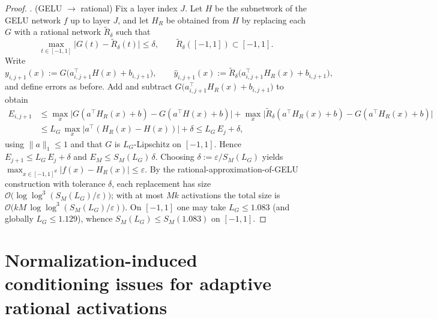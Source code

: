 \documentclass{article}
\theoremstyle{plain}
\theoremstyle{definition}
\theoremstyle{remark}
\begin{document}
\begin{proof}
. (GELU $\to$ rational) Fix a layer index $J$. Let $H$ be the subnetwork of the GELU network $f$ up to layer $J$, and let $H_R$ be obtained from $H$ by replacing each $G$ with a rational network $\widetilde R_\delta$ such that
\[
\max_{t\in[-1,1]}\bigl|G(t)-\widetilde R_\delta(t)\bigr|\le \delta,
\qquad
\widetilde R_\delta([-1,1])\subset[-1,1].
\]
Write
\[
y_{i,j+1}(x):=G\bigl(a_{i,j+1}^\top H(x)+b_{i,j+1}\bigr),\qquad
\widehat y_{i,j+1}(x):=\widetilde R_\delta\bigl(a_{i,j+1}^\top H_R(x)+b_{i,j+1}\bigr),
\]
and define errors as before. Add and subtract $G\bigl(a_{i,j+1}^\top H_R(x)+b_{i,j+1}\bigr)$ to obtain
\begin{align*}
E_{i,j+1}
&\le \max_{x}\bigl|G(a^\top H_R(x)+b)-G(a^\top H(x)+b)\bigr|
 + \max_{x}\bigl|\widetilde R_\delta(a^\top H_R(x)+b)-G(a^\top H_R(x)+b)\bigr| \\
&\le L_G\,\max_{x}\bigl|a^\top(H_R(x)-H(x))\bigr| + \delta
\le L_G\,E_j+\delta,
\end{align*}
using $\|a\|_1\le 1$ and that $G$ is $L_G$-Lipschitz on $[-1,1]$. Hence $E_{j+1}\le L_G\,E_j+\delta$ and $E_M\le S_M(L_G)\,\delta$. Choosing $\delta:=\varepsilon/S_M(L_G)$ yields $\max_{x\in[-1,1]^d}|f(x)-H_R(x)|\le \varepsilon$. By the rational-approximation-of-GELU construction with tolerance $\delta$, each replacement has size $\mathcal{O}\bigl(\log\log^3(S_M(L_G)/\varepsilon)\bigr)$; with at most $Mk$ activations the total size is $\mathcal{O}\bigl(kM\,\log\log^3(S_M(L_G)/\varepsilon)\bigr)$. On $[-1,1]$ one may take $L_G\le 1.083$ (and globally $L_G\le 1.129$), whence $S_M(L_G)\le S_M(1.083)$ on $[-1,1]$.
\end{proof}

\newpage
\section{Normalization-induced conditioning issues for adaptive rational activations}
\label{app:norm_hurtful}
\end{document}
